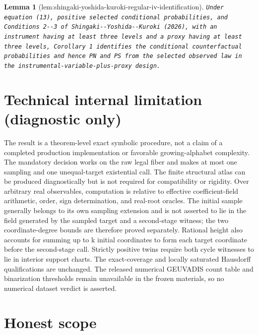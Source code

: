 \documentclass{article}
\newtheorem{lemma}{Lemma}
\begin{document}
\begin{lemma}[lem:shingaki-yoshida-kuroki-regular-iv-identification]\label{lem:shingaki-yoshida-kuroki-regular-iv-identification}
\texttt{Under equation (13),\allowbreak{} positive selected conditional probabilities,\allowbreak{} and Conditions 2-\allowbreak{}-\allowbreak{}3 of Shingaki-\allowbreak{}-\allowbreak{}Yoshida-\allowbreak{}-\allowbreak{}Kuroki (2026),\allowbreak{} with an instrument having at least three levels and a proxy having at least three levels,\allowbreak{} Corollary 1 identifies the conditional counterfactual probabilities and hence PN and PS from the selected observed law in the instrumental-\allowbreak{}variable-\allowbreak{}plus-\allowbreak{}proxy design.}
\end{lemma}

\section*{Technical internal limitation (diagnostic only)}

The result is a theorem-level exact symbolic procedure, not a claim of a completed production implementation or favorable growing-alphabet complexity. The mandatory decision works on the raw legal fiber and makes at most one sampling and one unequal-target existential call. The finite structural atlas can be produced diagnostically but is not required for compatibility or rigidity. Over arbitrary real observables, computation is relative to effective coefficient-field arithmetic, order, sign determination, and real-root oracles. The initial sample generally belongs to its own sampling extension and is not asserted to lie in the field generated by the sampled target and a second-stage witness; the two coordinate-degree bounds are therefore proved separately. Rational height also accounts for summing up to k initial coordinates to form each target coordinate before the second-stage call. Strictly positive twins require both cycle witnesses to lie in interior support charts. The exact-coverage and locally saturated Hausdorff qualifications are unchanged. The released numerical GEUVADIS count table and binarization thresholds remain unavailable in the frozen materials, so no numerical dataset verdict is asserted.

\section{Honest scope}
\end{document}
